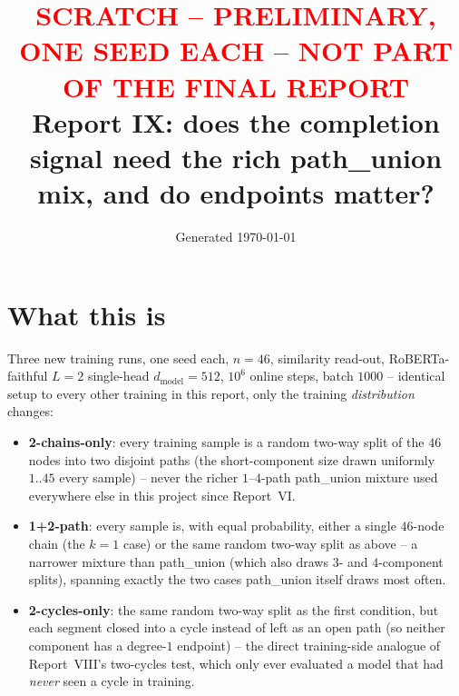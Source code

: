 \documentclass[11pt,a4paper]{article}
\title{\textcolor{red}{SCRATCH -- PRELIMINARY, ONE SEED EACH -- NOT PART OF THE FINAL REPORT} \\
       Report IX: does the completion signal need the rich path\_union mix, and do endpoints
       matter?}
\author{}
\date{Generated \today}
\begin{document}
\maketitle

\begin{center}
\end{center}

\section*{What this is}

Three new training runs, one seed each, $n=46$, similarity read-out, RoBERTa-faithful $L=2$
single-head $d_{\mathrm{model}}=512$, $10^6$ online steps, batch $1000$ -- identical setup to
every other training in this report, only the training \emph{distribution} changes:

\begin{itemize}\setlength\itemsep{0.15em}
  \item \textbf{2-chains-only}: every training sample is a random two-way split of the $46$
        nodes into two disjoint paths (the short-component size drawn uniformly $1..45$ every
        sample) -- never the richer $1$--$4$-path path\_union mixture used everywhere else in
        this project since Report~VI.
  \item \textbf{1+2-path}: every sample is, with equal probability, either a single $46$-node
        chain (the $k{=}1$ case) or the same random two-way split as above -- a narrower mixture
        than path\_union (which also draws $3$- and $4$-component splits), spanning exactly the
        two cases path\_union itself draws most often.
  \item \textbf{2-cycles-only}: the same random two-way split as the first condition, but each
        segment closed into a cycle instead of left as an open path (so neither component has a
        degree-$1$ endpoint) -- the direct training-side analogue of Report~VIII's two-cycles
        test, which only ever evaluated a model that had \emph{never} seen a cycle in training.
\end{itemize}
\end{document}
